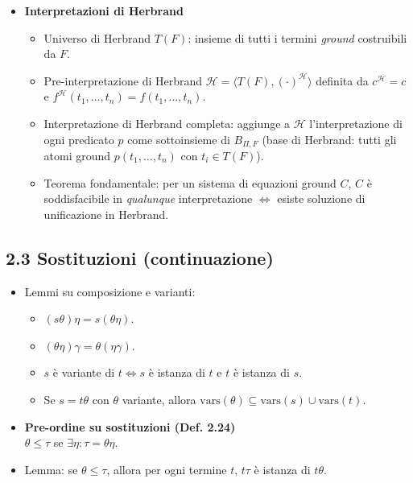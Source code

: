 \documentclass[12pt]{article}
\begin{document}
\begin{itemize}
  \item \textbf{Interpretazioni di Herbrand}\\
    \begin{itemize}
      \item Universo di Herbrand $T(F)$: insieme di tutti i termini \emph{ground} costruibili da $F$.
      \item Pre-interpretazione di Herbrand $\mathcal{H} = \langle T(F), (\cdot)^\mathcal{H}\rangle$ definita da $c^\mathcal{H}=c$ e $f^\mathcal{H}(t_1,\dots,t_n)=f(t_1,\dots,t_n)$.
      \item Interpretazione di Herbrand completa: aggiunge a $\mathcal{H}$ l’interpretazione di ogni predicato $p$ come sottoinsieme di $B_{\Pi,F}$ (base di Herbrand: tutti gli atomi ground $p(t_1,\dots,t_n)$ con $t_i\in T(F)$).
      \item Teorema fondamentale: per un sistema di equazioni ground $C$, $C$ è soddisfacibile in \emph{qualunque} interpretazione $\iff$ esiste soluzione di unificazione in Herbrand.
    \end{itemize}
\end{itemize}

\subsection*{2.3 Sostituzioni (continuazione)}

\begin{itemize}
  \item Lemmi su composizione e varianti:
    \begin{itemize}
      \item $(s\theta)\eta = s(\theta\eta)$.
      \item $(\theta\eta)\gamma = \theta(\eta\gamma)$.
      \item $s$ è variante di $t \iff s$ è istanza di $t$ e $t$ è istanza di $s$.
      \item Se $s = t\theta$ con $\theta$ variante, allora $\mathrm{vars}(\theta)\subseteq \mathrm{vars}(s)\cup \mathrm{vars}(t)$.
    \end{itemize}

  \item \textbf{Pre-ordine su sostituzioni (Def. 2.24)}\\
    $\theta \leq \tau$ se $\exists \eta: \tau = \theta\eta$.

  \item Lemma: se $\theta \leq \tau$, allora per ogni termine $t$, $t\tau$ è istanza di $t\theta$.
\end{itemize}
\end{document}

